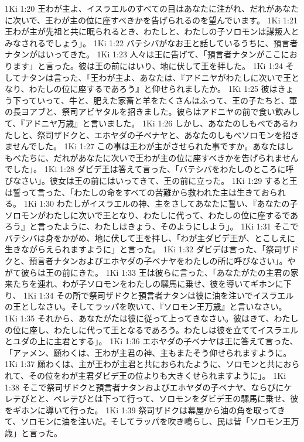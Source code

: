 1Ki 1:20  王わが主よ、イスラエルのすべての目はあなたに注がれ、だれがあなたに次いで、王わが主の位に座すべきかを告げられるのを望んでいます。
1Ki 1:21  王わが主が先祖と共に眠られるとき、わたしと、わたしの子ソロモンは謀叛人とみなされるでしょう」。
1Ki 1:22  バテシバがなお王と話しているうちに、預言者ナタンがはいってきた。
1Ki 1:23  人々は王に告げて、「預言者ナタンがここにおります」と言った。彼は王の前にはいり、地に伏して王を拝した。
1Ki 1:24  そしてナタンは言った、「王わが主よ、あなたは、『アドニヤがわたしに次いで王となり、わたしの位に座するであろう』と仰せられましたか。
1Ki 1:25  彼はきょう下っていって、牛と、肥えた家畜と羊をたくさんほふって、王の子たちと、軍の長ヨアブと、祭司アビヤタルを招きました。彼らはアドニヤの前で食い飲みして、『アドニヤ万歳』と言いました。
1Ki 1:26  しかし、あなたのしもべであるわたしと、祭司ザドクと、エホヤダの子ベナヤと、あなたのしもべソロモンを招きませんでした。
1Ki 1:27  この事は王わが主がさせられた事ですか。あなたはしもべたちに、だれがあなたに次いで王わが主の位に座すべきかを告げられませんでした」。
1Ki 1:28  ダビデ王は答えて言った、「バテシバをわたしのところに呼びなさい」。彼女は王の前にはいってきて、王の前に立った。
1Ki 1:29  すると王は誓って言った、「わたしの命をすべての苦難から救われた主は生きておられる。
1Ki 1:30  わたしがイスラエルの神、主をさしてあなたに誓い、『あなたの子ソロモンがわたしに次いで王となり、わたしに代って、わたしの位に座するであろう』と言ったように、わたしはきょう、そのようにしよう」。
1Ki 1:31  そこでバテシバは身をかがめ、地に伏して王を拝し、「わが主ダビデ王が、とこしえに生きながらえられますように」と言った。
1Ki 1:32  ダビデは言った、「祭司ザドクと、預言者ナタンおよびエホヤダの子ベナヤをわたしの所に呼びなさい」。やがて彼らは王の前にきた。
1Ki 1:33  王は彼らに言った、「あなたがたの主君の家来たちを連れ、わが子ソロモンをわたしの騾馬に乗せ、彼を導いてギホンに下り、
1Ki 1:34  その所で祭司ザドクと預言者ナタンは彼に油を注いでイスラエルの王としなさい。そしてラッパを吹いて、『ソロモン王万歳』と言いなさい。
1Ki 1:35  それから、あなたがたは彼に従って上ってきなさい。彼はきて、わたしの位に座し、わたしに代って王となるであろう。わたしは彼を立ててイスラエルとユダの上に主君とする」。
1Ki 1:36  エホヤダの子ベナヤは王に答えて言った、「アァメン、願わくは、王わが主君の神、主もまたそう仰せられますように。
1Ki 1:37  願わくは、主が王わが主君と共におられたように、ソロモンと共におられて、その位をわが主君ダビデ王の位よりも大きくせられますように」。
1Ki 1:38  そこで祭司ザドクと預言者ナタンおよびエホヤダの子ベナヤ、ならびにケレテびとと、ペレテびとは下って行って、ソロモンをダビデ王の騾馬に乗せ、彼をギホンに導いて行った。
1Ki 1:39  祭司ザドクは幕屋から油の角を取ってきて、ソロモンに油を注いだ。そしてラッパを吹き鳴らし、民は皆「ソロモン王万歳」と言った。
